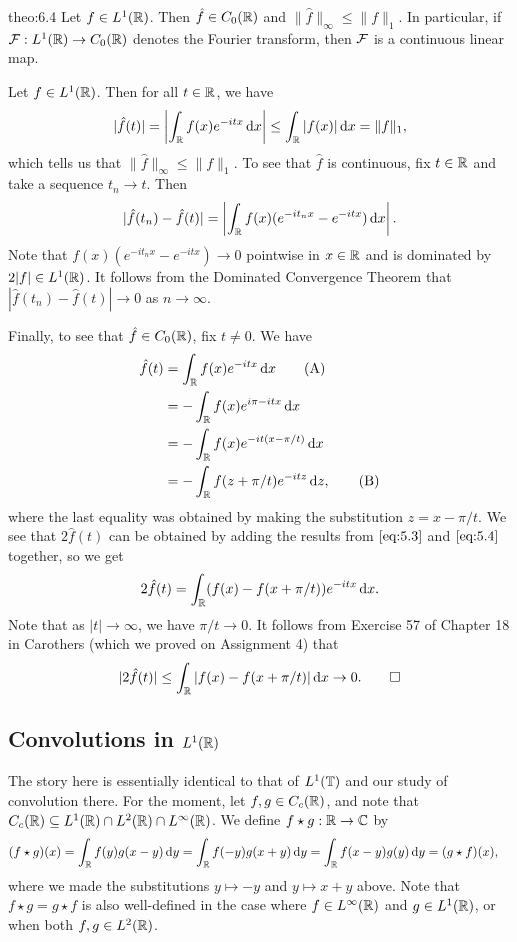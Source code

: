 \begin{theo}{theo:6.4}
    Let $f \in L^1(\mathbb{R})$. Then $\hat f \in C_0(\mathbb{R})$ and $\|\hat f\|_\infty 
    \leq \|f\|_1$. In particular, if ${\cal F} : L^1(\mathbb{R}) \to C_0(\mathbb{R})$ 
    denotes the Fourier transform, then ${\cal F}$ is a continuous linear map. 
\end{theo}
\begin{pf}
    Let $f \in L^1(\mathbb{R})$. Then for all $t \in \mathbb{R}$, we have 
    \[ |\hat f(t)| = \left| \int_{\mathbb{R}} f(x) e^{-itx}\,\mathrm{d} x \right| \leq 
    \int_{\mathbb{R}} |f(x)|\,\mathrm{d} x = \|f\|_1, \] 
    which tells us that $\|\hat f\|_\infty \leq \|f\|_1$. To see that 
    $\hat f$ is continuous, fix $t \in \mathbb{R}$ and take a sequence $t_n \to t$. 
    Then
    \[ |\hat f(t_n) - \hat f(t)| = \left| \int_{\mathbb{R}} f(x) (e^{-it_nx} - e^{-itx})\,\mathrm{d} x \right|. \] 
    Note that $f(x)(e^{-it_nx} - e^{-itx}) \to 0$ pointwise in $x \in \mathbb{R}$ 
    and is dominated by $2|f| \in L^1(\mathbb{R})$. It follows from the Dominated 
    Convergence Theorem that $|\hat f(t_n) - \hat f(t)| \to 0$ as $n \to \infty$. 

    Finally, to see that $\hat f \in C_0(\mathbb{R})$, fix $t \neq 0$. We have 
    \begin{align*}
        \hat f(t) &= \int_{\mathbb{R}} f(x) e^{-itx}\,\mathrm{d} x \tag{A} \label{eq:5.3} \\ 
        &= -\int_{\mathbb{R}} f(x) e^{i\pi-itx}\,\mathrm{d} x \\ 
        &= -\int_{\mathbb{R}} f(x) e^{-it(x-\pi/t)}\,\mathrm{d} x \\ 
        &= -\int_{\mathbb{R}} f(z + \pi/t) e^{-itz}\,\mathrm{d} z, \tag{B} \label{eq:5.4}
    \end{align*}
    where the last equality was obtained by making the substitution $z = 
    x - \pi/t$. We see that $2\hat f(t)$ can be obtained by 
    adding the results from $\eqref{eq:5.3}$ and $\eqref{eq:5.4}$ together, 
    so we get 
    \[ 2\hat f(t) = \int_{\mathbb{R}} (f(x) - f(x + \pi/t)) e^{-itx}\,\mathrm{d} x. \] 
    Note that as $|t| \to \infty$, we have $\pi/t \to 0$. It follows from 
    Exercise 57 of Chapter 18 in Carothers (which we proved on Assignment 4)
    that 
    \[ |2\hat f(t)| \leq \int_{\mathbb{R}} |f(x) - f(x + \pi/t)|\,\mathrm{d} x \to 0. \qedhere \] 
\end{pf}

\subsection{Convolutions in $L^1(\mathbb{R})$} \label{subsec:6.2}
The story here is essentially identical to that of $L^1(\mathbb{T})$ and our 
study of convolution there. For the moment, let $f, g \in C_c(\mathbb{R})$, 
and note that $C_c(\mathbb{R}) \subseteq L^1(\mathbb{R}) \cap L^2(\mathbb{R}) \cap L^\infty(\mathbb{R})$.
We define $f \star g : \mathbb{R} \to \mathbb{C}$ by 
\begin{align*}
    (f \star g)(x) &= \int_{\mathbb{R}} f(y)g(x - y)\,\mathrm{d} y 
    = \int_{\mathbb{R}} f(-y) g(x+y) \,\mathrm{d} y 
    = \int_{\mathbb{R}} f(x-y) g(y) \,\mathrm{d} y = (g \star f)(x), 
\end{align*}
where we made the substitutions $y \mapsto -y$ and $y \mapsto x+y$ above. 
Note that $f \star g = g \star f$ is also well-defined in the case where 
$f \in L^\infty(\mathbb{R})$ and $g \in L^1(\mathbb{R})$, or when both $f, g \in L^2(\mathbb{R})$. 

